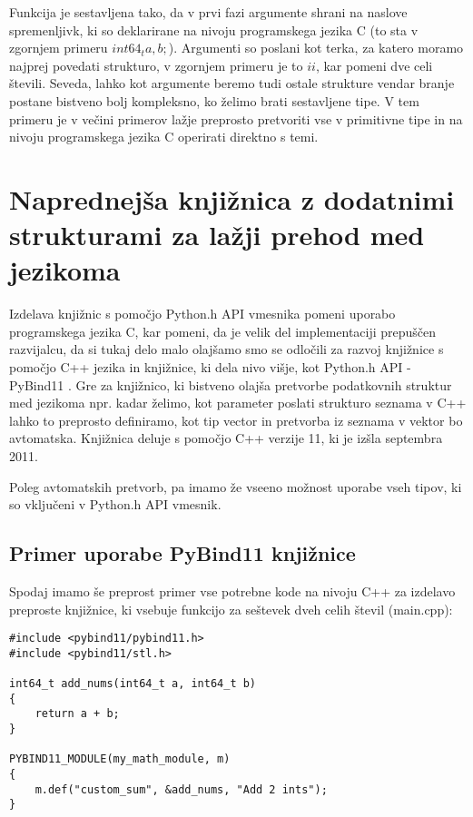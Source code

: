 \documentclass[a4paper,12pt,openright]{book}
\begin{document}
    \noindent
    Funkcija je sestavljena tako, da v prvi fazi argumente shrani na naslove spremenljivk, ki so deklarirane na nivoju programskega jezika C (to sta v zgornjem primeru $int64_t a, b;$). Argumenti so poslani kot terka, za katero moramo najprej povedati strukturo, v zgornjem primeru je to $ii$, kar pomeni dve celi števili. Seveda, lahko kot argumente beremo tudi ostale strukture vendar branje postane bistveno bolj kompleksno, ko želimo brati sestavljene tipe. V tem primeru je v večini primerov lažje preprosto pretvoriti vse v primitivne tipe in na nivoju programskega jezika C operirati direktno s temi.

    \section{Naprednejša knjižnica z dodatnimi strukturami za lažji prehod med jezikoma}

    Izdelava knjižnic s pomočjo Python.h API vmesnika pomeni uporabo programskega jezika C, kar pomeni, da je velik del implementaciji prepuščen razvijalcu, da si tukaj delo malo olajšamo smo se odločili za razvoj knjižnice s pomočjo C++ jezika in knjižnice, ki dela nivo višje, kot Python.h API - PyBind11 \cite{PYBIND11_GITHUB}. Gre za knjižnico, ki bistveno olajša pretvorbe podatkovnih struktur med jezikoma npr. kadar želimo, kot parameter poslati strukturo seznama v C++ lahko to preprosto definiramo, kot tip vector in pretvorba iz seznama v vektor bo avtomatska. Knjižnica deluje s pomočjo C++ verzije 11, ki je izšla septembra 2011.

    Poleg avtomatskih pretvorb, pa imamo že vseeno možnost uporabe vseh tipov, ki so vključeni v Python.h API vmesnik.

    \subsection{Primer uporabe PyBind11 knjižnice}
    Spodaj imamo še preprost primer vse potrebne kode na nivoju C++ za izdelavo preproste knjižnice, ki vsebuje funkcijo za seštevek dveh celih števil (main.cpp):
\begin{verbatim}
#include <pybind11/pybind11.h>
#include <pybind11/stl.h>

int64_t add_nums(int64_t a, int64_t b)
{
    return a + b;
}

PYBIND11_MODULE(my_math_module, m)
{
    m.def("custom_sum", &add_nums, "Add 2 ints");
}
\end{verbatim}
\end{document}
